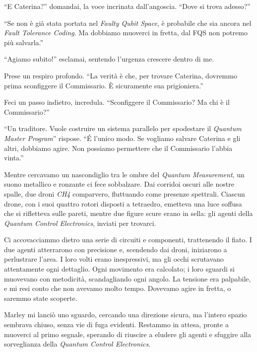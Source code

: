 \begin{dialogue}
 \enquote{E Caterina?} domandai, la voce incrinata dall'angoscia. \enquote{Dove si trova adesso?}

  \enquote{Se non è già stata portata nel \textit{Faulty Qubit Space}, è probabile che sia ancora nel \textit{Fault Tolerance Coding}. Ma dobbiamo muoverci in fretta, dal FQS non potremo più salvarla.}

 \enquote{Agiamo subito!} esclamai, sentendo l'urgenza crescere dentro di me.

 Prese un respiro profondo. \enquote{La verità è che, per trovare Caterina, dovremmo prima sconfiggere il Commissario. È sicuramente sua prigioniera.}

 Feci un passo indietro, incredula. \enquote{Sconfiggere il Commissario? Ma chi è il Commissario?}

 \enquote{Un traditore. Vuole costruire un sistema parallelo per spodestare il \textit{Quantum Master Program}} rispose. \enquote{\'E l'unico modo. Se vogliamo salvare Caterina e gli altri, dobbiamo agire. Non possiamo permettere che il Commissario l'abbia vinta.}
\end{dialogue}

Mentre cercavamo un nascondiglio tra le ombre del \textit{Quantum Measurement}, un suono metallico e ronzante ci fece sobbalzare. Dai corridoi oscuri alle nostre spalle, due droni \textit{CH4} comparvero, fluttuando come presenze spettrali. Ciascun drone, con i suoi quattro rotori disposti a tetraedro, emetteva una luce soffusa che si rifletteva sulle pareti, mentre due figure scure erano in sella: gli agenti della \textit{Quantum Control Electronics}, inviati per trovarci.

Ci accovacciammo dietro una serie di circuiti e componenti, trattenendo il fiato. I due agenti atterrarono con precisione e, scendendo dai droni, iniziarono a perlustrare l'area. I loro volti erano inespressivi, ma gli occhi scrutavano attentamente ogni dettaglio. Ogni movimento era calcolato; i loro sguardi si muovevano con metodicità, scandagliando ogni angolo. La tensione era palpabile, e mi resi conto che non avevamo molto tempo. Dovevamo agire in fretta, o saremmo state scoperte.

Marley mi lanciò uno sguardo, cercando una direzione sicura, ma l'intero spazio sembrava chiuso, senza vie di fuga evidenti. Restammo in attesa, pronte a muoverci al primo segnale, sperando di riuscire a eludere gli agenti e sfuggire alla sorveglianza della \textit{Quantum Control Electronics}.

